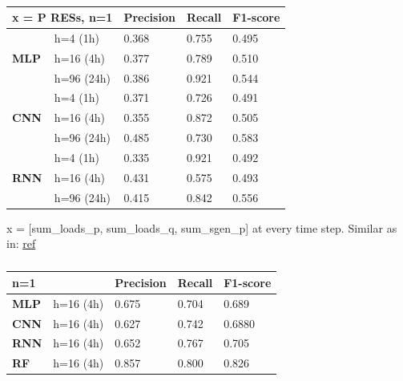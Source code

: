 \begin{table}[H]
\centering
\begin{tabular}{|ll|l|l|l|}
\hline
\multicolumn{2}{|l|}{x = P RESs, n=1} & \textbf{Precision} & \textbf{Recall} & \textbf{F1-score} \\ \hline
\multicolumn{1}{|l|}{\multirow{3}{*}{\textbf{MLP}}} & h=4 (1h)   & 0.368 & 0.755 & 0.495 \\ \cline{2-5} 
\multicolumn{1}{|l|}{}                              & h=16 (4h)  & 0.377 & 0.789 & 0.510 \\ \cline{2-5} 
\multicolumn{1}{|l|}{}                              & h=96 (24h) & 0.386 & 0.921 & 0.544 \\ \hline
\multicolumn{1}{|l|}{\multirow{3}{*}{\textbf{CNN}}} & h=4 (1h)   & 0.371 & 0.726 & 0.491 \\ \cline{2-5} 
\multicolumn{1}{|l|}{}                              & h=16 (4h)  & 0.355 & 0.872 & 0.505 \\ \cline{2-5} 
\multicolumn{1}{|l|}{}                              & h=96 (24h) & 0.485 & 0.730 & 0.583 \\ \hline
\multicolumn{1}{|l|}{\multirow{3}{*}{\textbf{RNN}}} & h=4 (1h)   & 0.335 & 0.921 & 0.492 \\ \cline{2-5} 
\multicolumn{1}{|l|}{}                              & h=16 (4h)  & 0.431 & 0.575 & 0.493 \\ \cline{2-5} 
\multicolumn{1}{|l|}{}                              & h=96 (24h) & 0.415 & 0.842 & 0.556 \\ \hline
\end{tabular}
\caption{}
\label{tab:my-table}
\end{table}

x = [sum\_loads\_p, sum\_loads\_q, sum\_sgen\_p] at every time step. Similar as in: \href{https://arxiv.org/abs/2008.09384}{ref}
\begin{table}[H]
\centering
\begin{tabular}{|ll|l|l|l|}
\hline
\multicolumn{2}{|l|}{n=1} & \textbf{Precision} & \textbf{Recall} & \textbf{F1-score} \\ \hline
\multicolumn{1}{|l|}{\textbf{MLP}} & h=16 (4h) & 0.675 & 0.704 & 0.689 \\ \hline
\multicolumn{1}{|l|}{\textbf{CNN}} & h=16 (4h) & 0.627 & 0.742 & 0.6880 \\ \hline
\multicolumn{1}{|l|}{\textbf{RNN}} & h=16 (4h) & 0.652 & 0.767 & 0.705 \\ \hline
\multicolumn{1}{|l|}{\textbf{RF}}  & h=16 (4h) & 0.857 & 0.800 & 0.826 \\ \hline
\end{tabular}
\caption{}
\label{tab:5.4}
\end{table}

